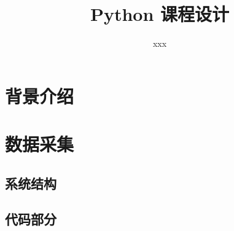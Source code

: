 \documentclass[UTF8]{article}
\title{Python 课程设计}
\author{xxx}
\date{}
\begin{document}
\maketitle

\section{背景介绍}

\section{数据采集}
\subsection{系统结构}


\subsection{代码部分}
\end{document}

